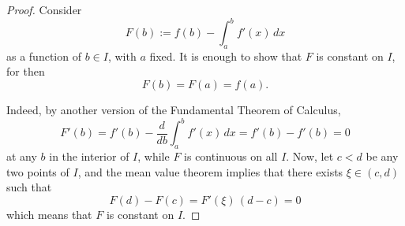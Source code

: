 

\begin{proof}

Consider
$$
F(b) := f(b) - \int_a^b f'(x)\,dx 
$$
as a function of $b\in I$, with $a$ fixed. It is enough to 
show that $F$ is constant on $I$, for then 
$$
F(b) = F(a) = f(a).
$$

Indeed, by another version of the Fundamental Theorem of Calculus,
$$
F'(b) = f'(b) - \frac{d}{db}\int_a^b f'(x)\, dx = f'(b) - f'(b) = 0
$$
at any $b$ in the interior of $I$, while $F$ is continuous on all $I$. 
Now, let $c<d$ be any two points of $I$, and the mean value theorem 
implies that there exists $\xi\in (c,d)$ such that
$$
F(d) - F(c) = F'(\xi)\, (d-c) = 0
$$
which means that $F$ is constant on $I$.

\end{proof}


